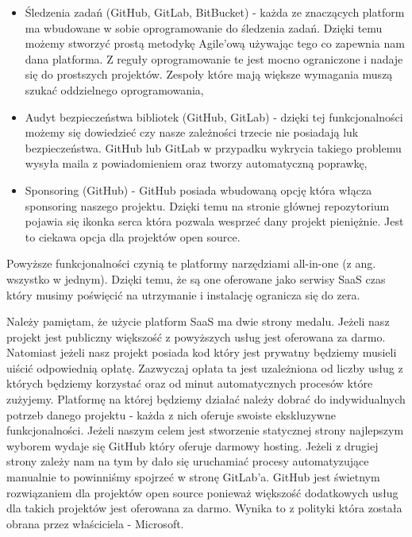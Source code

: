 \begin{itemize}
    \item Śledzenia zadań (GitHub, GitLab, BitBucket) - każda ze znaczących platform ma wbudowane w sobie oprogramowanie do śledzenia zadań. Dzięki temu możemy stworzyć prostą metodykę Agile'ową używając tego co zapewnia nam dana platforma. Z reguły oprogramowanie te jest mocno ograniczone i nadaje się do prostszych projektów. Zespoły które mają większe wymagania muszą szukać oddzielnego oprogramowania,
    \item Audyt bezpieczeństwa bibliotek (GitHub, GitLab) - dzięki tej funkcjonalności możemy się dowiedzieć czy nasze zależności trzecie nie posiadają luk bezpieczeństwa. GitHub lub GitLab w przypadku wykrycia takiego problemu wysyła maila z powiadomieniem oraz tworzy automatyczną poprawkę,
    \item Sponsoring (GitHub) - GitHub posiada wbudowaną opcję która włącza sponsoring naszego projektu. Dzięki temu na stronie głównej repozytorium pojawia się ikonka serca która pozwala wesprzeć dany projekt pieniężnie. Jest to ciekawa opcja dla projektów open source.
\end{itemize}
Powyższe funkcjonalności czynią te platformy narzędziami all-in-one (z ang. wszystko w jednym). Dzięki temu, że są one oferowane jako serwisy SaaS czas który musimy poświęcić na utrzymanie i instalację ogranicza się do zera.
\par
Należy pamiętam, że użycie platform SaaS ma dwie strony medalu. Jeżeli nasz projekt jest publiczny większość z powyższych usług jest oferowana za darmo. Natomiast jeżeli nasz projekt posiada kod który jest prywatny będziemy musieli uiścić odpowiednią opłatę. Zazwyczaj opłata ta jest uzależniona od liczby usług z których będziemy korzystać oraz od minut automatycznych procesów które zużyjemy. Platformę na której będziemy działać należy dobrać do indywidualnych potrzeb danego projektu - każda z nich oferuje swoiste ekskluzywne funkcjonalności. Jeżeli naszym celem jest stworzenie statycznej strony najlepszym wyborem wydaje się GitHub który oferuje darmowy hosting. Jeżeli z drugiej strony zależy nam na tym by dało się uruchamiać procesy automatyzujące manualnie to powinniśmy spojrzeć w stronę GitLab'a. GitHub jest świetnym rozwiązaniem dla projektów open source ponieważ większość dodatkowych usług dla takich projektów jest oferowana za darmo. Wynika to z polityki która została obrana przez właściciela - Microsoft.

